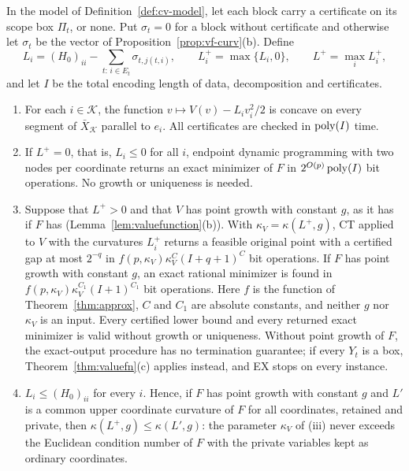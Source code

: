 \begin{theorem}\label{thm:cv}
In the model of Definition~\ref{def:cv-model}, let each block carry a
certificate on its scope box $\Pi_t$, or none. Put $\sigma_t=0$ for a block
without certificate and otherwise let $\sigma_t$ be the vector of
Proposition~\ref{prop:vf-curv}(b). Define
\begin{equation}\label{eq:cv-L}
L_i=(H_0)_{ii}-\sum_{t:\,i\in E_t}\sigma_{t,j(t,i)},\qquad
L_i^+=\max\{L_i,0\},\qquad L^+=\max_iL_i^+,
\end{equation}
and let $I$ be the total encoding length of data, decomposition and
certificates.
\begin{enumerate}
\item[(i)] For each $i\in\mathcal K$, the function $v\mapsto V(v)-L_iv_i^2/2$
is concave on every segment of $\bar X_{\mathcal K}$ parallel to $e_i$. All
certificates are checked in $\operatorname{poly}(I)$ time.
\item[(ii)] If $L^+=0$, that is, $L_i\le0$ for all $i$, endpoint dynamic
programming with two nodes per coordinate returns an exact minimizer of $F$
in $2^{O(p)}\operatorname{poly}(I)$ bit operations. No growth or uniqueness is needed.
\item[(iii)] Suppose that $L^+>0$ and that $V$ has point growth with
constant $g$, as it has if $F$ has (Lemma~\ref{lem:valuefunction}(b)).
With $\kappa_V=\kappa(L^+,g)$, CT applied to $V$ with the curvatures $L_i^+$
returns a feasible original point with a certified gap at most $2^{-q}$ in
$f(p,\kappa_V)\kappa_V^C(I+q+1)^C$ bit operations. If $F$ has point growth
with constant $g$, an exact rational minimizer is found in
$f(p,\kappa_V)\kappa_V^{C_1}(I+1)^{C_1}$ bit operations. Here $f$ is the
function of Theorem~\ref{thm:approx}, $C$ and $C_1$ are absolute constants,
and neither $g$ nor $\kappa_V$ is an input. Every certified lower bound and
every returned exact minimizer is valid without growth or uniqueness.
Without point growth of $F$, the exact-output procedure has no termination
guarantee; if every $Y_t$ is a box, Theorem~\ref{thm:valuefn}(c) applies
instead, and EX stops on every instance.
\item[(iv)] $L_i\le(H_0)_{ii}$ for every $i$. Hence, if $F$ has point
growth with constant $g$ and $L'$ is a common upper coordinate curvature of
$F$ for all coordinates, retained and private, then
$\kappa(L^+,g)\le\kappa(L',g)$: the parameter $\kappa_V$ of (iii) never
exceeds the Euclidean condition number of $F$ with the private variables
kept as ordinary coordinates.
\end{enumerate}
\end{theorem}

